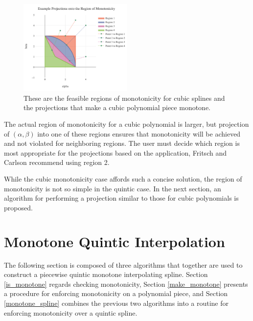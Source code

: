 \documentclass{scspaperproc}
\theoremstyle{scsthe}
\begin{document}
\begin{figure}
  \centering
  \includegraphics[width=0.50\textwidth]{demo_projection}
  \caption{These are the feasible regions of monotonicity for cubic splines and the projections that make a cubic polynomial piece monotone.}\label{fig:projection}
\end{figure}

The actual region of monotonicity for a cubic polynomial is larger, but projection of $(\alpha, \beta)$ into one of these regions ensures that monotonicity will be achieved and not violated for neighboring regions. The user must decide which region is most appropriate for the projections based on the application, Fritsch and Carlson recommend using region 2.

While the cubic monotonicity case affords such a concise solution, the region of monotonicity is not so simple in the quintic case. In the next section, an algorithm for performing a projection similar to those for cubic polynomials is proposed.



\section{Monotone Quintic Interpolation}

The following section is composed of three algorithms that together are used to construct a piecewise quintic monotone interpolating spline. Section \ref{is_monotone} regards checking monotonicity, Section \ref{make_monotone} presents a procedure for enforcing monotonicity on a polynomial piece, and Section \ref{monotone_spline} combines the previous two algorithms into a routine for enforcing monotonicity over a quintic spline.
\end{document}
